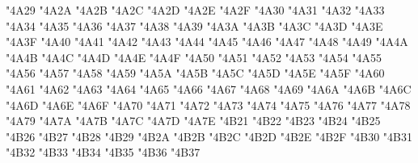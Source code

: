 {\Uchar\jis"4A29 %
\Uchar\jis"4A2A %
\Uchar\jis"4A2B %
\Uchar\jis"4A2C %
\Uchar\jis"4A2D %
\Uchar\jis"4A2E %
\Uchar\jis"4A2F %
\Uchar\jis"4A30 %
\Uchar\jis"4A31 %
\Uchar\jis"4A32 %
\Uchar\jis"4A33 %
\Uchar\jis"4A34 %
\Uchar\jis"4A35 %
\Uchar\jis"4A36 %
\Uchar\jis"4A37 %
\Uchar\jis"4A38 %
\Uchar\jis"4A39 %
\Uchar\jis"4A3A %
\Uchar\jis"4A3B %
\Uchar\jis"4A3C %
\Uchar\jis"4A3D %
\Uchar\jis"4A3E %
\Uchar\jis"4A3F %
\Uchar\jis"4A40 %
\Uchar\jis"4A41 %
\Uchar\jis"4A42 %
\Uchar\jis"4A43 %
\Uchar\jis"4A44 %
\Uchar\jis"4A45 %
\Uchar\jis"4A46 %
\Uchar\jis"4A47 %
\Uchar\jis"4A48 %
\Uchar\jis"4A49 %
\Uchar\jis"4A4A %
\Uchar\jis"4A4B %
\Uchar\jis"4A4C %
\Uchar\jis"4A4D %
\Uchar\jis"4A4E %
\Uchar\jis"4A4F %
\Uchar\jis"4A50 %
\Uchar\jis"4A51 %
\Uchar\jis"4A52 %
\Uchar\jis"4A53 %
\Uchar\jis"4A54 %
\Uchar\jis"4A55 %
\Uchar\jis"4A56 %
\Uchar\jis"4A57 %
\Uchar\jis"4A58 %
\Uchar\jis"4A59 %
\Uchar\jis"4A5A %
\Uchar\jis"4A5B %
\Uchar\jis"4A5C %
\Uchar\jis"4A5D %
\Uchar\jis"4A5E %
\Uchar\jis"4A5F %
\Uchar\jis"4A60 %
\Uchar\jis"4A61 %
\Uchar\jis"4A62 %
\Uchar\jis"4A63 %
\Uchar\jis"4A64 %
\Uchar\jis"4A65 %
\Uchar\jis"4A66 %
\Uchar\jis"4A67 %
\Uchar\jis"4A68 %
\Uchar\jis"4A69 %
\Uchar\jis"4A6A %
\Uchar\jis"4A6B %
\Uchar\jis"4A6C %
\Uchar\jis"4A6D %
\Uchar\jis"4A6E %
\Uchar\jis"4A6F %
\Uchar\jis"4A70 %
\Uchar\jis"4A71 %
\Uchar\jis"4A72 %
\Uchar\jis"4A73 %
\Uchar\jis"4A74 %
\Uchar\jis"4A75 %
\Uchar\jis"4A76 %
\Uchar\jis"4A77 %
\Uchar\jis"4A78 %
\Uchar\jis"4A79 %
\Uchar\jis"4A7A %
\Uchar\jis"4A7B %
\Uchar\jis"4A7C %
\Uchar\jis"4A7D %
\Uchar\jis"4A7E %
\Uchar\jis"4B21 %
\Uchar\jis"4B22 %
\Uchar\jis"4B23 %
\Uchar\jis"4B24 %
\Uchar\jis"4B25 %
\Uchar\jis"4B26 %
\Uchar\jis"4B27 %
\Uchar\jis"4B28 %
\Uchar\jis"4B29 %
\Uchar\jis"4B2A %
\Uchar\jis"4B2B %
\Uchar\jis"4B2C %
\Uchar\jis"4B2D %
\Uchar\jis"4B2E %
\Uchar\jis"4B2F %
\Uchar\jis"4B30 %
\Uchar\jis"4B31 %
\Uchar\jis"4B32 %
\Uchar\jis"4B33 %
\Uchar\jis"4B34 %
\Uchar\jis"4B35 %
\Uchar\jis"4B36 %
\Uchar\jis"4B37 %
}
